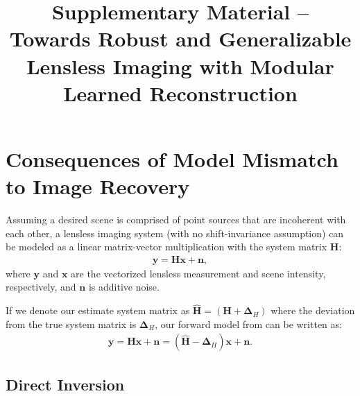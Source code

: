 \clearpage


\title{Supplementary Material --\\Towards Robust and Generalizable Lensless Imaging with Modular Learned Reconstruction}

\maketitle

\appendices

\section{Consequences of Model Mismatch to Image Recovery}
\label{app:mismatch}

\noindent Assuming a desired scene is comprised of point sources that are incoherent with each other, a lensless imaging system (with no shift-invariance assumption) can be modeled as a linear matrix-vector multiplication with the system matrix $\bm{H}$:
\begin{align}
    \label{eq:forward_gen_app}
    \bm{y} = \bm{H}\bm{x} + \bm{n},
\end{align}
where $\bm{y}$ and $\bm{x}$ are the vectorized lensless measurement and scene intensity, respectively, and $\bm{n}$ is additive noise.

If we denote our estimate system matrix as $\bm{\hat{H}}=(\bm{H}+\bm{\Delta}_H)$ where the deviation from the true system matrix is $\bm{\Delta}_H$,
our forward model from can be written as:
\begin{align}
    \label{eq:mismatch_forward_app}
    \bm{y} = \bm{H}\bm{x} + \bm{n} = (\bm{\hat{H}} - \bm{\Delta}_H)\bm{x} + \bm{n}.
\end{align}


\subsection{Direct Inversion}

